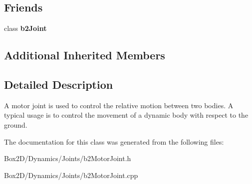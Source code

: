 \subsection*{Friends}
\begin{DoxyCompactItemize}
\item 
\mbox{\label{classb2_motor_joint_a54ade8ed3d794298108d7f4c4e4793fa}} 
class {\bfseries b2\+Joint}
\end{DoxyCompactItemize}
\subsection*{Additional Inherited Members}


\subsection{Detailed Description}
A motor joint is used to control the relative motion between two bodies. A typical usage is to control the movement of a dynamic body with respect to the ground. 

The documentation for this class was generated from the following files\+:\begin{DoxyCompactItemize}
\item 
Box2\+D/\+Dynamics/\+Joints/b2\+Motor\+Joint.\+h\item 
Box2\+D/\+Dynamics/\+Joints/b2\+Motor\+Joint.\+cpp\end{DoxyCompactItemize}
